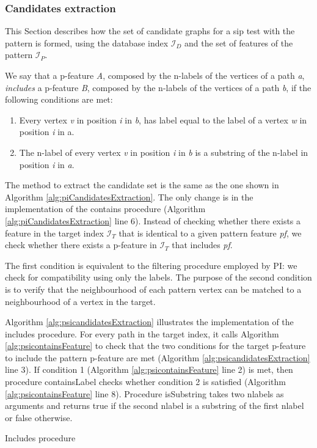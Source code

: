 \documentclass{l4proj}
\newcommand{\fancyI}{\mathcal{I}}
\begin{document}
\subsubsection{Candidates extraction}
\label{pi:candExtr}
This Section describes how the set of candidate graphs for a \gls{sip} test with the pattern is formed, using the database index $\fancyI_{D}$ and the set of features of the pattern $\fancyI_{P}$.

We say that a p-feature \emph{A}, composed by the n-labels of the vertices of a path \emph{a}, \emph{includes} a p-feature \emph{B}, composed by the n-labels of the vertices of a path \emph{b}, if the following conditions are met:
\begin{enumerate}
\item Every vertex \emph{v} in position \emph{i} in \emph{b}, has label equal to the label of a vertex \emph{w} in position \emph{i} in a.
\item The n-label of every vertex \emph{v} in position \emph{i} in \emph{b} is a substring of the n-label in position \emph{i} in \emph{a}.
\end{enumerate}

The method to extract the candidate set is the same as the one shown in Algorithm \ref{alg:piCandidatesExtraction}. The only change is in the implementation of the contains procedure (Algorithm \ref{alg:piCandidatesExtraction} line 6). Instead of checking whether there exists a feature in the target index $\fancyI_{T}$ that is identical to a given pattern feature \emph{pf}, we check whether there exists a p-feature in $\fancyI_{T}$ that includes \emph{pf}.

The first condition is equivalent to the filtering procedure employed by PI: we check for compatibility using only the labels. The purpose of the second condition is to verify that the neighbourhood of each pattern vertex can be matched to a neighbourhood of a vertex in the target.

Algorithm \ref{alg:psicandidatesExtraction} illustrates the implementation of the includes procedure. For every path in the target index, it calls Algorithm \ref{alg:psicontainsFeature} to check that the two conditions for the target p-feature to include the pattern p-feature are met (Algorithm \ref{alg:psicandidatesExtraction} line 3). If condition 1 (Algorithm \ref{alg:psicontainsFeature} line 2) is met, then procedure containsLabel checks whether condition 2 is satisfied (Algorithm \ref{alg:psicontainsFeature} line 8). Procedure isSubstring takes two nlabels as arguments and returns true if the second nlabel is a substring of the first nlabel or false otherwise.
\begin{algorithm}
\centering
\caption{Includes procedure}
\label{alg:psicandidatesExtraction}
\begin{algorithmic}[1]
 
    \EndIf
\EndFor
{}
\EndProcedure
\end{algorithmic}
\end{algorithm}
\end{document}
